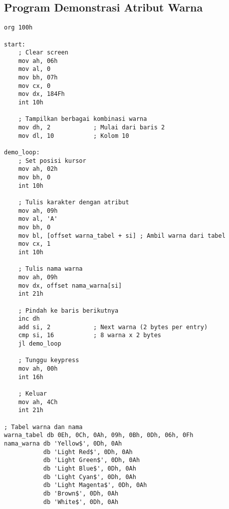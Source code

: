 \documentclass[../main.tex]{subfiles}
\begin{document}
        \subsection{Program Demonstrasi Atribut Warna}
            \begin{lstlisting}[language={[x86masm]Assembler}, caption=Program Demonstrasi Atribut Warna, label={lst:color-demo}]
org 100h

start:
    ; Clear screen
    mov ah, 06h
    mov al, 0
    mov bh, 07h
    mov cx, 0
    mov dx, 184Fh
    int 10h
    
    ; Tampilkan berbagai kombinasi warna
    mov dh, 2            ; Mulai dari baris 2
    mov dl, 10           ; Kolom 10
    
demo_loop:
    ; Set posisi kursor
    mov ah, 02h
    mov bh, 0
    int 10h
    
    ; Tulis karakter dengan atribut
    mov ah, 09h
    mov al, 'A'
    mov bh, 0
    mov bl, [offset warna_tabel + si] ; Ambil warna dari tabel
    mov cx, 1
    int 10h
    
    ; Tulis nama warna
    mov ah, 09h
    mov dx, offset nama_warna[si]
    int 21h
    
    ; Pindah ke baris berikutnya
    inc dh
    add si, 2            ; Next warna (2 bytes per entry)
    cmp si, 16           ; 8 warna x 2 bytes
    jl demo_loop
    
    ; Tunggu keypress
    mov ah, 00h
    int 16h
    
    ; Keluar
    mov ah, 4Ch
    int 21h

; Tabel warna dan nama
warna_tabel db 0Eh, 0Ch, 0Ah, 09h, 0Bh, 0Dh, 06h, 0Fh
nama_warna db 'Yellow$', 0Dh, 0Ah
           db 'Light Red$', 0Dh, 0Ah
           db 'Light Green$', 0Dh, 0Ah
           db 'Light Blue$', 0Dh, 0Ah
           db 'Light Cyan$', 0Dh, 0Ah
           db 'Light Magenta$', 0Dh, 0Ah
           db 'Brown$', 0Dh, 0Ah
           db 'White$', 0Dh, 0Ah
            \end{lstlisting}
\end{document}
